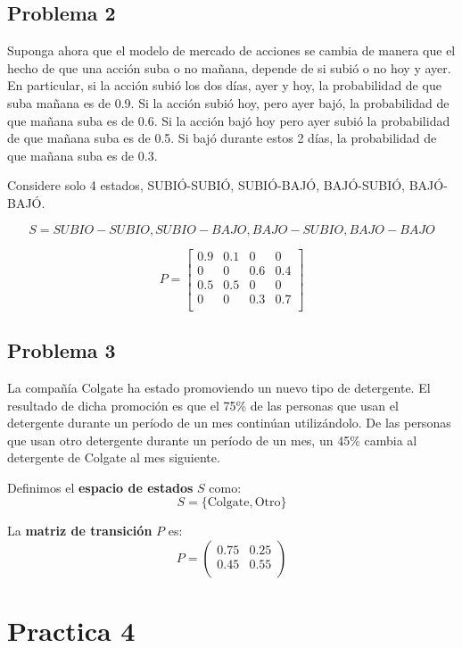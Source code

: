 \documentclass{article}
\begin{document}
\subsection{Problema 2}

Suponga ahora que el modelo de mercado de acciones se cambia de manera que el hecho de que una acción suba o no mañana, depende de si subió o no hoy y ayer. En particular, si la acción subió los dos días, ayer y hoy, la probabilidad de que suba mañana es de 0.9. Si la acción subió hoy, pero ayer bajó, la probabilidad de que mañana suba es de 0.6. Si la acción bajó hoy pero ayer subió la probabilidad de que mañana suba es de 0.5. Si bajó durante estos 2 días, la probabilidad de que mañana suba es de 0.3.

Considere solo 4 estados, SUBIÓ-SUBIÓ, SUBIÓ-BAJÓ, BAJÓ-SUBIÓ, BAJÓ-BAJÓ.

\[S={SUBIO-SUBIO,SUBIO-BAJO,BAJO-SUBIO,BAJO-BAJO}\]

\[
    P = \begin{bmatrix}
        0.9 & 0.1 & 0   & 0   \\
        0   & 0   & 0.6 & 0.4 \\
        0.5 & 0.5 & 0   & 0   \\
        0   & 0   & 0.3 & 0.7 \\
    \end{bmatrix}
\]

\subsection{Problema 3}

La compañía Colgate ha estado promoviendo un nuevo tipo de detergente. El resultado de dicha promoción es que el 75\% de las personas que usan el detergente durante un período de un mes continúan utilizándolo. De las personas que usan otro detergente durante un período de un mes, un 45\% cambia al detergente de Colgate al mes siguiente.


Definimos el \textbf{espacio de estados} \( S \) como:
\[ S = \{ \text{Colgate}, \text{Otro} \} \]

La \textbf{matriz de transición} \( P \) es:
\[
    P = \begin{pmatrix}
        0.75 & 0.25 \\
        0.45 & 0.55 \\
    \end{pmatrix}
\]

\section{Practica 4}
\end{document}
